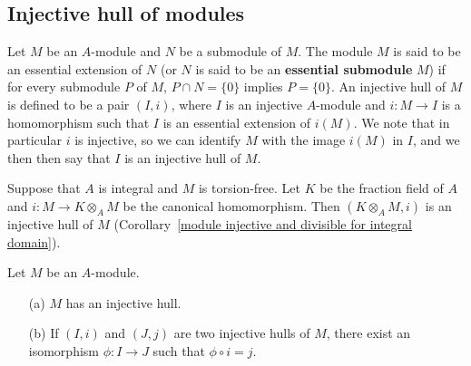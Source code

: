 \subsection{Injective hull of modules}
Let $M$ be an $A$-module and $N$ be a submodule of $M$. The module $M$ is said to be an essential extension of $N$ (or $N$ is said to be an \textbf{essential submodule} $M$) if for every submodule $P$ of $M$, $P\cap N=\{0\}$ implies $P=\{0\}$. An injective hull of $M$ is defined to be a pair $(I,i)$, where $I$ is an injective $A$-module and $i:M\to I$ is a homomorphism such that $I$ is an essential extension of $i(M)$. We note that in particular $i$ is injective, so we can identify $M$ with the image $i(M)$ in $I$, and we then then say that $I$ is an injective hull of $M$.
\begin{example}
Suppose that $A$ is integral and $M$ is torsion-free. Let $K$ be the fraction field of $A$ and $i:M\to K\otimes_AM$ be the canonical homomorphism. Then $(K\otimes_AM,i)$ is an injective hull of $M$ (Corollary~\ref{module injective and divisible for integral domain}).
\end{example}
\begin{theorem}\label{module injective hull exist}
Let $M$ be an $A$-module.
\begin{itemize}
\item[(a)] $M$ has an injective hull.
\item[(b)] If $(I,i)$ and $(J,j)$ are two injective hulls of $M$, there exist an isomorphism $\phi:I\to J$ such that $\phi\circ i=j$.
\end{itemize}
\end{theorem}
